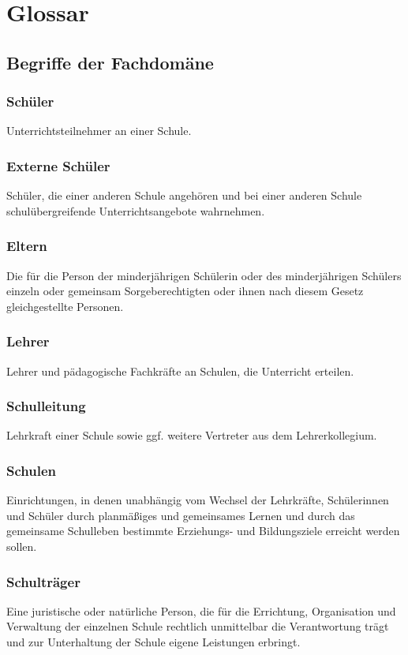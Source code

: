 \section{Glossar}
\label{glossary}

\subsection{Begriffe der Fachdomäne}

\subsubsection*{Schüler}
Unterrichtsteilnehmer an einer Schule.

\subsubsection*{Externe Schüler}
Schüler, die einer anderen Schule angehören und bei einer anderen Schule schulübergreifende Unterrichtsangebote wahrnehmen.

\subsubsection*{Eltern}
Die für die Person der minderjährigen Schülerin oder des minderjährigen Schülers einzeln oder gemeinsam Sorgeberechtigten oder ihnen nach diesem Gesetz gleichgestellte Personen.

\subsubsection*{Lehrer}
Lehrer und pädagogische Fachkräfte an Schulen, die Unterricht erteilen.

\subsubsection*{Schulleitung}
Lehrkraft einer Schule sowie ggf. weitere Vertreter aus dem Lehrerkollegium.

\subsubsection*{Schulen}
Einrichtungen, in denen unabhängig vom Wechsel der Lehrkräfte, Schülerinnen und Schüler durch planmäßiges und gemeinsames Lernen und durch das gemeinsame Schulleben bestimmte Erziehungs- und Bildungsziele erreicht werden sollen.

\subsubsection*{Schulträger}
Eine juristische oder natürliche Person, die für die Errichtung, Organisation und Verwaltung der einzelnen Schule rechtlich unmittelbar die Verantwortung trägt und zur Unterhaltung der Schule eigene Leistungen erbringt.

